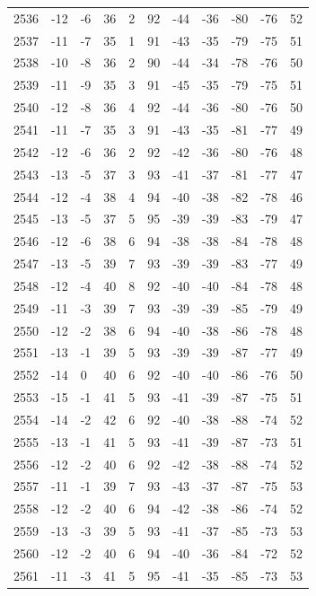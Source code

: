 \begin{table}[H]
\begin{tabular}{lllllllllll}
2536 & -12 & -6 & 36 & 2 & 92 & -44 & -36 & -80 & -76 & 52 \\
2537 & -11 & -7 & 35 & 1 & 91 & -43 & -35 & -79 & -75 & 51 \\
2538 & -10 & -8 & 36 & 2 & 90 & -44 & -34 & -78 & -76 & 50 \\
2539 & -11 & -9 & 35 & 3 & 91 & -45 & -35 & -79 & -75 & 51 \\
2540 & -12 & -8 & 36 & 4 & 92 & -44 & -36 & -80 & -76 & 50 \\
2541 & -11 & -7 & 35 & 3 & 91 & -43 & -35 & -81 & -77 & 49 \\
2542 & -12 & -6 & 36 & 2 & 92 & -42 & -36 & -80 & -76 & 48 \\
2543 & -13 & -5 & 37 & 3 & 93 & -41 & -37 & -81 & -77 & 47 \\
2544 & -12 & -4 & 38 & 4 & 94 & -40 & -38 & -82 & -78 & 46 \\
2545 & -13 & -5 & 37 & 5 & 95 & -39 & -39 & -83 & -79 & 47 \\
2546 & -12 & -6 & 38 & 6 & 94 & -38 & -38 & -84 & -78 & 48 \\
2547 & -13 & -5 & 39 & 7 & 93 & -39 & -39 & -83 & -77 & 49 \\
2548 & -12 & -4 & 40 & 8 & 92 & -40 & -40 & -84 & -78 & 48 \\
2549 & -11 & -3 & 39 & 7 & 93 & -39 & -39 & -85 & -79 & 49 \\
2550 & -12 & -2 & 38 & 6 & 94 & -40 & -38 & -86 & -78 & 48 \\
2551 & -13 & -1 & 39 & 5 & 93 & -39 & -39 & -87 & -77 & 49 \\
2552 & -14 & 0 & 40 & 6 & 92 & -40 & -40 & -86 & -76 & 50 \\
2553 & -15 & -1 & 41 & 5 & 93 & -41 & -39 & -87 & -75 & 51 \\
2554 & -14 & -2 & 42 & 6 & 92 & -40 & -38 & -88 & -74 & 52 \\
2555 & -13 & -1 & 41 & 5 & 93 & -41 & -39 & -87 & -73 & 51 \\
2556 & -12 & -2 & 40 & 6 & 92 & -42 & -38 & -88 & -74 & 52 \\
2557 & -11 & -1 & 39 & 7 & 93 & -43 & -37 & -87 & -75 & 53 \\
2558 & -12 & -2 & 40 & 6 & 94 & -42 & -38 & -86 & -74 & 52 \\
2559 & -13 & -3 & 39 & 5 & 93 & -41 & -37 & -85 & -73 & 53 \\
2560 & -12 & -2 & 40 & 6 & 94 & -40 & -36 & -84 & -72 & 52 \\
2561 & -11 & -3 & 41 & 5 & 95 & -41 & -35 & -85 & -73 & 53 \\

\end{tabular}
\end{table}
